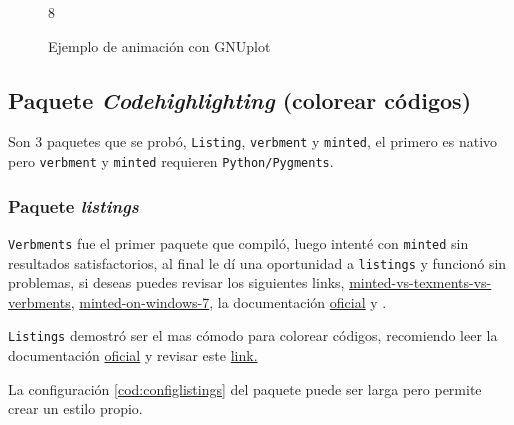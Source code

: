 \begin{figure}[H]
	\begin{center}	
		\begin{animateinline}[controls,
			autoplay,buttonsize=1.2em,
			buttonbg=0.6:0.6:1,buttonfg=0.2:0.2:1,
			begin={\begin{tikzpicture}[scale=2]\drawaxes},
			end={\end{tikzpicture}}]{8}
			
			\xdef\pos{-2}
			\whiledo{\lengthtest{\pos pt < 2.1 pt}}{
				\drawg{\pos}\newframe
				\pgfmathsetmacro{\pos}{\pos + 0.1}
				\xdef\pos{\pos}
			}
			
			\drawg{\pos}
		\end{animateinline}
	\end{center}
	\caption{Ejemplo de animación con GNUplot}
	\label{fig:}        
\end{figure}

\subsection{Paquete \textit{Codehighlighting} (colorear códigos)}
Son 3 paquetes que se probó, \verb|Listing|, \verb|verbment| y \verb|minted|, el primero es nativo pero \verb|verbment| y \verb|minted| requieren \verb|Python/Pygments|. 	

\subsubsection{Paquete \textit{listings}}
\verb|Verbments| fue el primer paquete que compiló, luego intenté con \verb|minted| sin resultados satisfactorios, al final le dí una oportunidad a \verb|listings| y funcionó sin problemas, si deseas puedes revisar los siguientes links, \href{http://tex.stackexchange.com/questions/102596/minted-vs-texments-vs-verbments}{minted-vs-texments-vs-verbments}, \href{http://tex.stackexchange.com/questions/23458/how-to-install-syntax-highlight-package-minted-on-windows-7}{minted-on-windows-7}, la documentación \href{http://www.ctan.org/pkg/verbments}{oficial} y \cite[ver][Cap. 9.8]{F.2012}. 

\verb|Listings| demostró ser el mas cómodo para colorear códigos, recomiendo leer la documentación \href{http://www.ctan.org/tex-archive/macros/latex/contrib/listings/}{oficial} y revisar este \href{http://en.wikibooks.org/wiki/LaTeX/Source_Code_Listings}{link.}

La configuración \ref{cod:configlistings} del paquete puede ser larga pero permite crear un estilo propio.  


